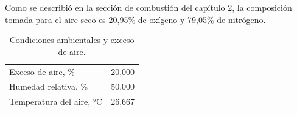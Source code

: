 \par Como se describió en la sección de combustión del capítulo 2, la composición tomada para el aire seco es 20,95\% de oxígeno y 79,05\% de nitrógeno.
\begin{table}[hbt]\begin{center}
\caption[Condiciones ambientales y exceso de aire]
{Condiciones ambientales y exceso de aire.}
\label{tbl:aire}\begin{tabular}{l|r}
	Exceso de aire, \%								& 20,000 \\
	Humedad relativa, \%							& 50,000 \\
	Temperatura del aire, °C						& 26,667 \\
\end{tabular}\end{center}\end{table}